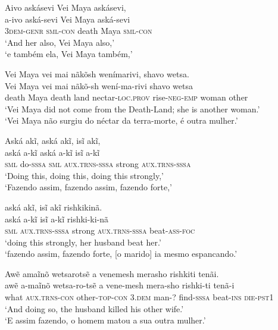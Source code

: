 \documentclass[output=paper,
modfonts,nonflat
]{langsci/langscibook}
\begin{document}
\ea Aivo askásevi Vei Maya askásevi, \\[.3em]
\gll a-ivo              aská-sevi        Vei   Maya aská-sevi        \\
     3\textsc{dem-genr} \textsc{sml-con} death Maya \textsc{sml-con} \\
\glt `And her also, Vei Maya also,' \\
`e também ela, Vei Maya também,' \\
\z

\ea Vei Maya vei mai nãkõsh wenímarivi, shavo wetsa. \\[.3em]
\gll Vei   Maya vei   mai  nãkõ-sh                  wení-ma-rivi          shavo wetsa \\
     death Maya death land nectar-\textsc{loc.prov} rise-\textsc{neg-emp} woman other \\
\glt `Vei Maya did not come from the Death-Land; she is another woman.'{\footnotemark} \\
`Vei Maya não surgiu do néctar da terra-morte, é outra mulher.' \\
\z

\newpage 
\ea Aská akĩ, aská akĩ, isĩ akĩ, \\[.3em]
\gll aská         a-kĩ             aská         a-kĩ                   isĩ    a-kĩ                   \\
     \textsc{sml} do-\textsc{sssa} \textsc{sml} \textsc{aux.trns-sssa} strong \textsc{aux.trns-sssa} \\
\glt `Doing this, doing this, doing this strongly,' \\
`Fazendo assim, fazendo assim, fazendo forte,' \\
\z

\ea aská akĩ, isĩ akĩ rishkikinã. \\[.3em]
\gll aská         a-kĩ                   isĩ    a-kĩ                   rishki-ki-nã          \\
     \textsc{sml} \textsc{aux.trns-sssa} strong \textsc{aux.trns-sssa} beat-\textsc{ass-foc} \\
\glt `doing this strongly, her husband beat her.' \\
`fazendo assim, fazendo forte, [o marido] ia mesmo espancando.' \\
\z

\ea Awẽ amaĩnõ wetsarotsẽ a venemesh merasho rishkiti tenãi. \\[.3em]
\gll awẽ  a-maĩnõ               wetsa-ro-tsẽ           a              vene-mesh mera-sho           rishki-ti         tenã-i            \\
     what \textsc{aux.trns-con} other-\textsc{top-con} \textsc{3.dem} man-?     find-\textsc{sssa} beat-\textsc{ins} \textsc{die-pst1} \\
\glt `And doing so, the husband killed his other wife.' \\
`E assim fazendo, o homem matou a sua outra mulher.' \\
\z
\end{document}
